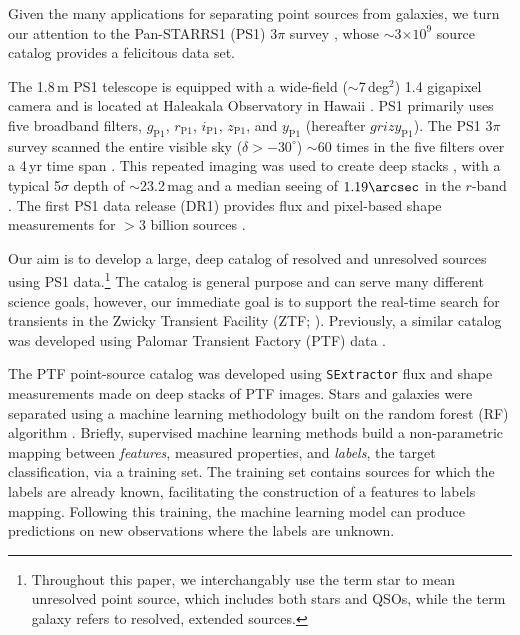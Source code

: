\documentclass[twocolumn]{aastex62}
\begin{document}
\begin{CJK*}{UTF8}{gbsn}
Given the many applications for separating point sources from
galaxies, we turn our attention to the Pan-STARRS1 (PS1) 3$\pi$ survey
\citep{Chambers16}, whose $\sim$3$\times 10^{9}$ source catalog provides a
felicitous data set.

The 1.8\,m PS1 telescope is equipped with a wide-field ($\sim$7\,deg$^2$)
1.4 gigapixel camera and is located at Haleakala Observatory in Hawaii
\citep{Hodapp04}. PS1 primarily uses five broadband filters,
$g_{\mathrm{P1}}$, $r_{\mathrm{P1}}$, $i_{\mathrm{P1}}$, $z_{\mathrm{P1}}$,
and $y_{\mathrm{P1}}$ (hereafter $grizy_{\mathrm{P1}}$). The PS1 3$\pi$
survey scanned the entire visible sky ($\delta > -30^\circ$) $\sim$60 times
in the five filters over a 4\,yr time span \citep{Chambers16}. This
repeated imaging was used to create deep stacks \citep{Magnier16a}, with a
typical 5$\sigma$ depth of $\sim$23.2\,mag and a median seeing of
$1.19\arcsec$ in the $r$-band \citep{Tonry12, Schlafly12, Chambers16}. The
first PS1 data release (DR1) provides flux and pixel-based shape
measurements for $>$3 billion sources \citep{Flewelling16}.

Our aim is to develop a large, deep catalog of resolved and unresolved
sources using PS1 data.\footnote{Throughout this paper, we interchangably
use the term star to mean unresolved point source, which includes both stars
and QSOs, while the term galaxy refers to resolved, extended sources.} The
catalog is general purpose and can serve many different science goals,
however, our immediate goal is to support the real-time search for
transients in the Zwicky Transient Facility (ZTF; \citealt{Bellm:18:ZTF}).
Previously, a similar catalog was developed using Palomar Transient Factory
(PTF) data \citep{Miller17}.

The PTF point-source catalog was developed using \texttt{SExtractor}
\citep{bertin96} flux and shape measurements made on deep stacks of PTF
images. Stars and galaxies were separated using a machine learning
methodology built on the random forest (RF) algorithm \citep{Breiman01}.
Briefly, supervised machine learning methods build a non-parametric mapping
between \textit{features}, measured properties, and \textit{labels}, the
target classification, via a training set. The training set contains sources
for which the labels are already known, facilitating the construction of a
features to labels mapping. Following this training, the machine learning
model can produce predictions on new observations where the labels are
unknown.


\end{CJK*}
\end{document}
